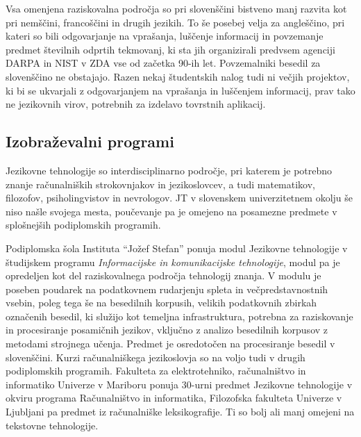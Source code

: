 \begin{multicols}{2}
Vsa omenjena raziskovalna področja so pri slovenščini bistveno manj razvita kot pri nemščini, francoščini in drugih jezikih. To še posebej velja za angleščino, pri kateri so bili odgovarjanje na vprašanja, luščenje informacij in povzemanje predmet številnih odprtih tekmovanj, ki sta jih organizirali predvsem agenciji DARPA in NIST v ZDA vse od začetka 90-ih let. Povzemalniki besedil za slovenščino ne obstajajo. Razen nekaj študentskih nalog tudi ni večjih projektov, ki bi se ukvarjali z odgovarjanjem na vprašanja in luščenjem informacij, prav tako ne jezikovnih virov, potrebnih za izdelavo tovrstnih aplikacij.

\subsection{Izobraževalni programi}

Jezikovne tehnologije so interdisciplinarno področje, pri katerem je potrebno znanje računalniških strokovnjakov in jezikoslovcev, a tudi matema\-tikov, filozofov, psiholingvistov in nevrologov. JT v slovenskem univerzitetnem okolju še niso našle svojega mesta, poučevanje pa je omejeno na posamezne predmete v splošnejših podiplomskih programih.

Podiplomska šola Instituta “Jožef Stefan” ponuja modul Jezikovne tehnologije v študijskem programu \textit{Informacij\-ske in komunikacij\-ske tehnologije}, modul pa je opredeljen kot del raziskovalnega področja tehnologij znanja. V modulu je poseben poudarek na podatkovnem rudarjenju spleta in večpredstavnostnih vsebin, poleg tega še na besedilnih korpusih, velikih podatkovnih zbirkah označenih besedil, ki služijo kot temeljna infrastruktura, potrebna za raziskovanje in procesiranje posamičnih jezikov, vključno z analizo besedilnih korpusov z metodami stroj\-nega učenja. Predmet je osredotočen na procesiranje besedil v slovenščini.
Kurzi računalniškega jezikoslovja so na voljo tudi v drugih podiplomskih programih. Fakulteta za elektrotehniko, računalništvo in informatiko Univerze v Mariboru ponuja 30-urni predmet Jezikovne tehnologije v okviru programa Računalništvo in informatika, Filozofska fakulteta Univerze v Ljub\-ljani pa predmet iz računalniške leksikografije. Ti so bolj ali manj omejeni na tekstovne tehnologije.



\end{multicols}
